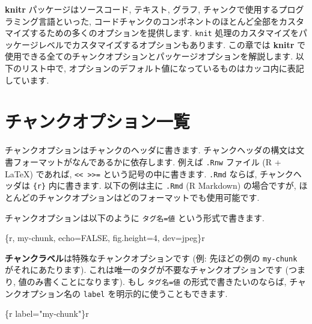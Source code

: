 \documentclass[
  lualatex,ja=standard,jafont=noto-otf]{bxjsreport}
\newenvironment{Shaded}{\begin{snugshade}}{\end{snugshade}}
\newcommand{\NormalTok}[1]{#1}
\begin{document}
\textbf{knitr} パッケージはソースコード, テキスト, グラフ,
チャンクで使用するプログラミング言語といった,
コードチャンクのコンポネントのほとんど全部をカスタマイズするための多くのオプションを提供します.
\texttt{knit}
処理のカスタマイズをパッケージレベルでカスタマイズするオプションもあります.
この章では \textbf{knitr}
で使用できる全てのチャンクオプションとパッケージオプションを解説します.
以下のリスト中で,
オプションのデフォルト値になっているものはカッコ内に表記しています.

\hypertarget{chunk-options}{%
\section{チャンクオプション一覧}\label{chunk-options}}

チャンクオプションはチャンクのヘッダに書きます.
チャンクヘッダの構文は文書フォーマットがなんであるかに依存します. 例えば
\texttt{.Rnw} ファイル (R + LaTeX) であれば,
\texttt{\textless{}\textless{}\ \textgreater{}\textgreater{}=}
という記号の中に書きます. \texttt{.Rmd} ならば, チャンクヘッダは
\texttt{\textasciigrave{}\textasciigrave{}\textasciigrave{}\{r\}}
内に書きます. 以下の例は主に \texttt{.Rmd} (R Markdown) の場合ですが,
ほとんどのチャンクオプションはどのフォーマットでも使用可能です.

チャンクオプションは以下のように \texttt{タグ名=値}
という形式で書きます.

\begin{Shaded}
\begin{Highlighting}[numbers=left,,]
\NormalTok{\textasciigrave{}\textasciigrave{}\textasciigrave{}\{r, my{-}chunk, echo=FALSE, fig.height=4, dev=\textquotesingle{}jpeg\textquotesingle{}\}\textasciigrave{}r \textquotesingle{}\textquotesingle{}\textasciigrave{}}
\NormalTok{\textasciigrave{}\textasciigrave{}\textasciigrave{}}
\end{Highlighting}
\end{Shaded}

\textbf{チャンクラベル}は特殊なチャンクオプションです (例: 先ほどの例の
\texttt{my-chunk} がそれにあたります).
これは唯一のタグが不要なチャンクオプションです (つまり,
値のみ書くことになります). もし \texttt{タグ名=値}
の形式で書きたいのならば, チャンクオプション名の \texttt{label}
を明示的に使うこともできます.

\begin{Shaded}
\begin{Highlighting}[numbers=left,,]
\NormalTok{\textasciigrave{}\textasciigrave{}\textasciigrave{}\{r label="my{-}chunk"\}\textasciigrave{}r \textquotesingle{}\textquotesingle{}\textasciigrave{}}
\NormalTok{\textasciigrave{}\textasciigrave{}\textasciigrave{}}
\end{Highlighting}
\end{Shaded}
\end{document}

